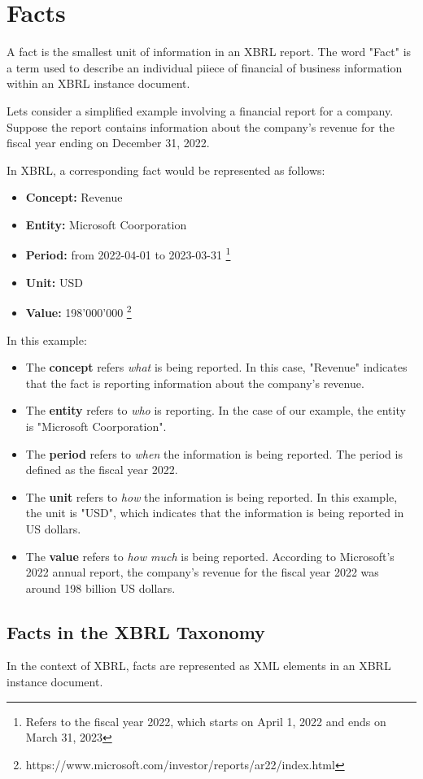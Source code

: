 \section{Facts}

A fact is the smallest unit of information in an XBRL report. 
The word "Fact" is a term used to describe an individual piiece of financial of business information within an XBRL instance document. 

Lets consider a simplified example involving a financial report for a company. 
Suppose the report contains information about the company's revenue for the fiscal year ending on December 31, 2022.

In XBRL, a corresponding fact would be represented as follows:

\begin{itemize}
    \item \textbf{Concept:} Revenue
    \item \textbf{Entity:} Microsoft Coorporation
    \item \textbf{Period:} from 2022-04-01 to 2023-03-31 \footnote[0]{Refers to the fiscal year 2022, which starts on April 1, 2022 and ends on March 31, 2023}
    \item \textbf{Unit:} USD
    \item \textbf{Value:} 198'000'000 \footnote[1]{https://www.microsoft.com/investor/reports/ar22/index.html}
\end{itemize}

In this example:

\begin{itemize}
    \item The \textbf{concept} refers \textit{what} is being reported. 
    In this case, "Revenue" indicates that the fact is reporting information about the company's revenue.
    \item The \textbf{entity} refers to \textit{who} is reporting. 
    In the case of our example, the entity is "Microsoft Coorporation".
    \item The \textbf{period} refers to \textit{when} the information is being reported.
    The period is defined as the fiscal year 2022.
    \item The \textbf{unit} refers to \textit{how} the information is being reported.
    In this example, the unit is "USD", which indicates that the information is being reported in US dollars.
    \item The \textbf{value} refers to \textit{how much} is being reported.
    According to Microsoft's 2022 annual report, the company's revenue for the fiscal year 2022 was around 198 billion US dollars.
\end{itemize}

\subsection{Facts in the XBRL Taxonomy}

In the context of XBRL, facts are represented as XML elements in an XBRL instance document. 
